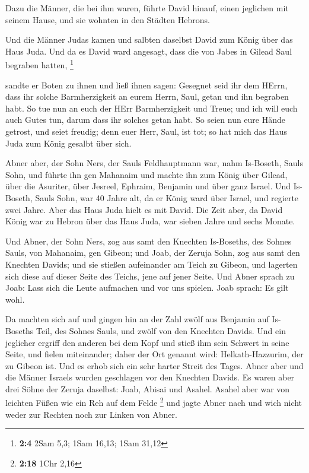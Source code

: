  Dazu die Männer, die bei ihm waren, führte David hinauf,
einen jeglichen mit seinem Hause, und sie wohnten in den Städten
Hebrons.

 Und die Männer Judas kamen und salbten daselbst David zum
König über das Haus Juda. Und da es David ward angesagt, dass die von
Jabes in Gilead Saul begraben hatten, \footnote{\textbf{2:4} 2Sam 5,3;
  1Sam 16,13; 1Sam 31,12}

 sandte er Boten zu ihnen und ließ ihnen sagen: Gesegnet
seid ihr dem HErrn, dass ihr solche Barmherzigkeit an eurem Herrn, Saul,
getan und ihn begraben habt.  So tue nun an euch der HErr
Barmherzigkeit und Treue; und ich will euch auch Gutes tun, darum dass
ihr solches getan habt.  So seien nun eure Hände getrost,
und seiet freudig; denn euer Herr, Saul, ist tot; so hat mich das Haus
Juda zum König gesalbt über sich.

 Abner aber, der Sohn Ners, der Sauls Feldhauptmann war,
nahm Is-Boseth, Sauls Sohn, und führte ihn gen Mahanaim  und
machte ihn zum König über Gilead, über die Asuriter, über Jesreel,
Ephraim, Benjamin und über ganz Israel.  Und Is-Boseth,
Sauls Sohn, war 40 Jahre alt, da er König ward über Israel, und regierte
zwei Jahre. Aber das Haus Juda hielt es mit David.  Die
Zeit aber, da David König war zu Hebron über das Haus Juda, war sieben
Jahre und sechs Monate.

 Und Abner, der Sohn Ners, zog aus samt den Knechten
Is-Boseths, des Sohnes Sauls, von Mahanaim, gen Gibeon; 
und Joab, der Zeruja Sohn, zog aus samt den Knechten Davids; und sie
stießen aufeinander am Teich zu Gibeon, und lagerten sich diese auf
dieser Seite des Teichs, jene auf jener Seite.  Und Abner
sprach zu Joab: Lass sich die Leute aufmachen und vor uns spielen. Joab
sprach: Es gilt wohl.

 Da machten sich auf und gingen hin an der Zahl zwölf aus
Benjamin auf Is-Boseths Teil, des Sohnes Sauls, und zwölf von den
Knechten Davids.  Und ein jeglicher ergriff den anderen bei
dem Kopf und stieß ihm sein Schwert in seine Seite, und fielen
miteinander; daher der Ort genannt wird: Helkath-Hazzurim, der zu Gibeon
ist.  Und es erhob sich ein sehr harter Streit des Tages.
Abner aber und die Männer Israels wurden geschlagen vor den Knechten
Davids.  Es waren aber drei Söhne der Zeruja daselbst:
Joab, Abisai und Asahel. Asahel aber war von leichten Füßen wie ein Reh
auf dem Felde \footnote{\textbf{2:18} 1Chr 2,16}  und jagte
Abner nach und wich nicht weder zur Rechten noch zur Linken von Abner.

